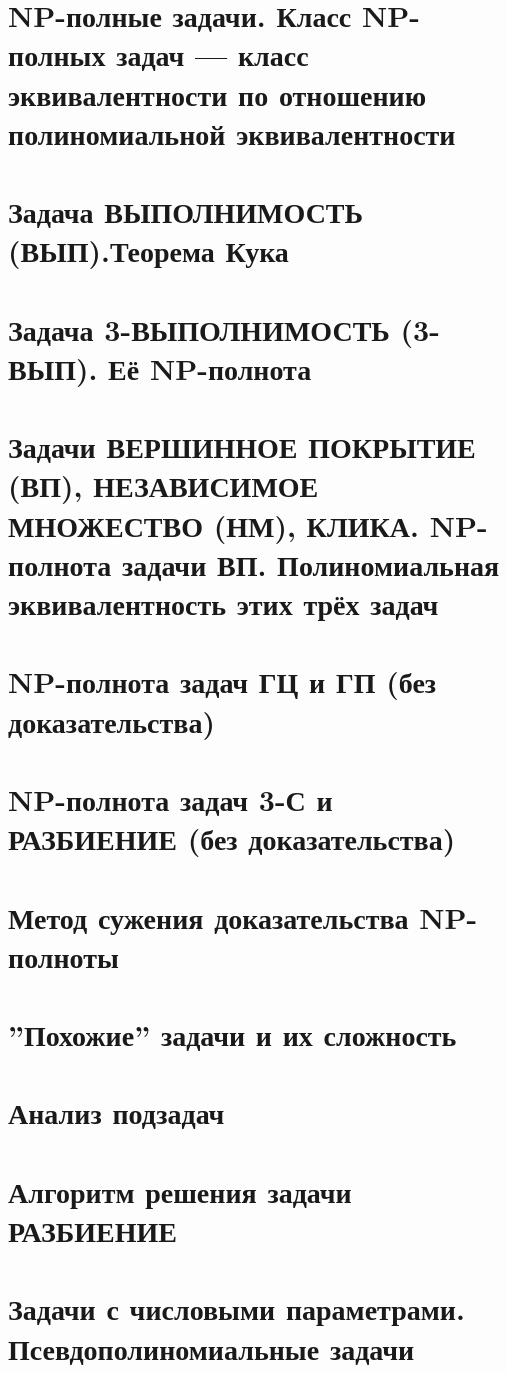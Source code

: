 \documentclass[40pt]{article}
\begin{document}
\section{NP-полные задачи. Класс NP-полных задач — класс эквивалентности по отношению полиномиальной эквивалентности}
\section{Задача ВЫПОЛНИМОСТЬ (ВЫП).Теорема Кука}
\section{Задача 3-ВЫПОЛНИМОСТЬ (3-ВЫП). Её NP-полнота}
\section{Задачи ВЕРШИННОЕ ПОКРЫТИЕ (ВП), НЕЗАВИСИМОЕ МНОЖЕСТВО (НМ), КЛИКА.  NP-полнота задачи ВП.  Полиномиальная эквивалентность этих трёх задач}
\section{NP-полнота задач ГЦ и ГП (без доказательства)}
\section{NP-полнота задач 3-С и РАЗБИЕНИЕ (без доказательства)}
\section{Метод сужения доказательства NP-полноты}
\section{''Похожие'' задачи и их сложность}
\section{Анализ подзадач}
\section{Алгоритм решения задачи РАЗБИЕНИЕ}
\section{Задачи с числовыми параметрами. Псевдополиномиальные задачи}
\end{document}

